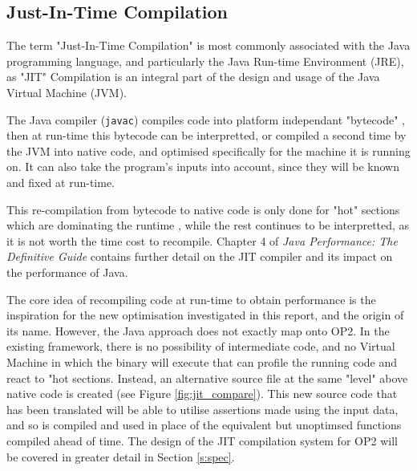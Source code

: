 \subsection{Just-In-Time Compilation}
\label{ss:rw_JIT}

The term "Just-In-Time Compilation" is most commonly associated with the Java programming language, and particularly the Java Run-time Environment (JRE), as "JIT" Compilation is an integral part of the design and usage of the Java Virtual Machine (JVM).

\par The Java compiler (\verb|javac|) compiles code into platform independant "bytecode" \cite{javac}, then at run-time this bytecode can be interpretted, or compiled a second time by the JVM into native code, and optimised specifically for the machine it is running on. It can also take the program's inputs into account, since they will be known and fixed at run-time.
\par
This re-compilation from bytecode to native code is only done for "hot" sections which are dominating the runtime \cite{javac}, while the rest continues to be interpretted, as it is not worth the time cost to recompile. Chapter 4 of \textit{Java Performance: The Definitive Guide} \cite{javaPerf} contains further detail on the JIT compiler and its impact on the performance of Java.
\par
The core idea of recompiling code at run-time to obtain performance is the inspiration for the new optimisation investigated in this report, and the origin of its name. However, the Java approach does not exactly map onto OP2. In the existing framework, there is no possibility of intermediate code, and no Virtual Machine in which the binary will execute that can profile the running code and react to "hot sections. Instead, an alternative source file at the same "level" above native code is created (see Figure \ref{fig:jit_compare}). This new source code that has been translated will be able to utilise assertions made using the input data, and so is compiled and used in place of the equivalent but unoptimsed functions compiled ahead of time. The design of the JIT compilation system for OP2 will be covered in greater detail in Section \ref{s:spec}.

